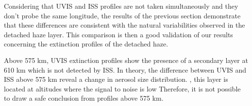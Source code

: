 Considering that UVIS and ISS profiles are not taken simultaneously and
they don't probe the same longitude, the results of the previous section demonstrate that these differences are
consistent with the natural variabilities observed in the detached haze layer.
This comparison is then a good validation of our results concerning the extinction profiles of the detached haze.

Above 575 km, UVIS extinction profiles show the presence of a secondary layer at 610 km which is not detected by ISS.
In theory, the difference between UVIS and ISS above 575 km  reveal a change in aerosol size distribution.
, this layer is located at altitudes where the signal to noise is low 
Therefore, it is not possible to draw a safe conclusion from  profiles above 575 km.
